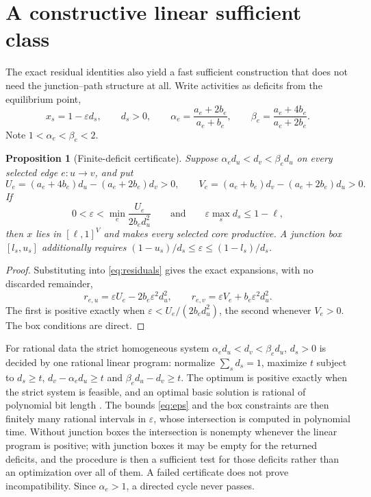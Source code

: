 \documentclass[11pt,a4paper]{article}
\theoremstyle{plain}
\newtheorem{proposition}[theorem]{Proposition}
\theoremstyle{definition}
\theoremstyle{remark}
\newcommand{\ru}{r_{e,u}}
\newcommand{\rv}{r_{e,v}}
\begin{document}
\section{A constructive linear sufficient class}\label{sec:linear}

The exact residual identities also yield a fast sufficient construction that does not need the junction--path structure at all. Write activities as deficits from the equilibrium point,
\[
  x_s=1-\varepsilon d_s,\qquad d_s>0,\qquad \alpha_e=\frac{a_e+2b_e}{a_e+b_e},\qquad \beta_e=\frac{a_e+4b_e}{a_e+2b_e}.
\]
Note $1<\alpha_e<\beta_e<2$.

\begin{proposition}[Finite-deficit certificate]\label{prop:linear}
Suppose $\alpha_ed_u<d_v<\beta_ed_u$ on every selected edge $e\colon u\to v$, and put
\[
  U_e=(a_e+4b_e)d_u-(a_e+2b_e)d_v>0,\qquad V_e=(a_e+b_e)d_v-(a_e+2b_e)d_u>0 .
\]
If
\begin{equation}\label{eq:eps}
  0<\varepsilon<\min_e\frac{U_e}{2b_ed_u^2}\qquad\text{and}\qquad \varepsilon\max_s d_s\le1-\ell,
\end{equation}
then $x$ lies in $[\ell,1]^V$ and makes every selected core productive. A junction box $[l_s,u_s]$ additionally requires $(1-u_s)/d_s\le\varepsilon\le(1-l_s)/d_s$.
\end{proposition}

\begin{proof}
Substituting into \eqref{eq:residuals} gives the exact expansions, with no discarded remainder,
\begin{equation}\label{eq:deficit}
  \ru=\varepsilon U_e-2b_e\varepsilon^2d_u^2,\qquad \rv=\varepsilon V_e+b_e\varepsilon^2d_u^2 .
\end{equation}
The first is positive exactly when $\varepsilon<U_e/(2b_ed_u^2)$, the second whenever $V_e>0$. The box conditions are direct.
\end{proof}

For rational data the strict homogeneous system $\alpha_ed_u<d_v<\beta_ed_u$, $d_s>0$ is decided by one rational linear program: normalize $\sum_sd_s=1$, maximize $t$ subject to $d_s\ge t$, $d_v-\alpha_ed_u\ge t$ and $\beta_ed_u-d_v\ge t$. The optimum is positive exactly when the strict system is feasible, and an optimal basic solution is rational of polynomial bit length \citep{khachiyan1979,schrijver1986}. The bounds \eqref{eq:eps} and the box constraints are then finitely many rational intervals in $\varepsilon$, whose intersection is computed in polynomial time. Without junction boxes the intersection is nonempty whenever the linear program is positive; with junction boxes it may be empty for the returned deficits, and the procedure is then a sufficient test for those deficits rather than an optimization over all of them. A failed certificate does not prove incompatibility. Since $\alpha_e>1$, a directed cycle never passes.
\end{document}
